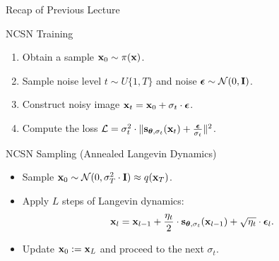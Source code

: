 \documentclass{beamer}
\begin{document}
\begin{frame}{Recap of Previous Lecture}
    \begin{block}{NCSN Training}
        \begin{enumerate}
            \item Obtain a sample $\mathbf{x}_0 \sim \pi(\mathbf{x})$.
            \item Sample noise level $t \sim U\{1, T\}$ and noise $\boldsymbol{\epsilon} \sim \mathcal{N}(0, \mathbf{I})$.
            \item Construct noisy image $\mathbf{x}_t = \mathbf{x}_0 + \sigma_t \cdot \boldsymbol{\epsilon}$.
            \item Compute the loss $ \mathcal{L} = \sigma_t^2 \cdot \| \mathbf{s}_{\boldsymbol{\theta}, \sigma_t}(\mathbf{x}_t) + \frac{\boldsymbol{\epsilon}}{\sigma_t} \|^2 $.
        \end{enumerate}
    \end{block}
    \begin{block}{NCSN Sampling (Annealed Langevin Dynamics)}
        \begin{itemize}
            \item Sample $\mathbf{x}_0 \sim \mathcal{N}(0, \sigma_T^2 \cdot \mathbf{I}) \approx q(\mathbf{x}_T)$.
            \item Apply $L$ steps of Langevin dynamics:
            \vspace{-0.2cm}
            \[
                \mathbf{x}_l = \mathbf{x}_{l-1} + \frac{\eta_t}{2} \cdot \mathbf{s}_{\boldsymbol{\theta}, \sigma_t}(\mathbf{x}_{l - 1}) + \sqrt{\eta_t} \cdot \boldsymbol{\epsilon}_l.
            \] 
            \vspace{-0.5cm}
            \item Update $\mathbf{x}_0 := \mathbf{x}_L$ and proceed to the next $\sigma_t$.
        \end{itemize}
    \end{block}
\end{frame}
\end{document}
